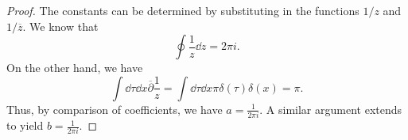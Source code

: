 \begin{proof}
	The constants can be determined by substituting in the functions $1 / z$ and $1 / \overline{z}$. We know that
	\[
		\oint \frac{1}{z}\dd{z} = 2\pi i
	.\]
	On the other hand, we have
	\[
		\int \dd{\tau}\dd{x} \overline{\partial}\frac{1}{z}=\int\dd{\tau}\dd{x} \pi\delta(\tau)\delta(x) = \pi
	.\] 
	Thus, by comparison of coefficients, we have $a=\frac{1}{2\pi i}$. A similar argument extends to yield $b=\frac{1}{2\pi i}$.
\end{proof}
